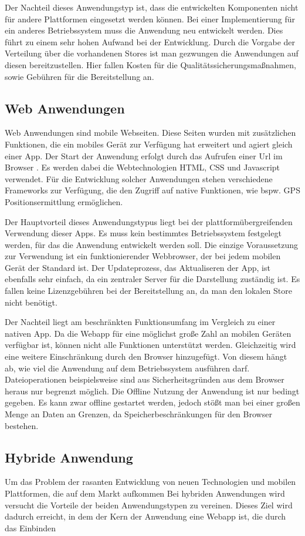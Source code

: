  Der Nachteil dieses Anwendungstyp ist, dass die entwickelten Komponenten nicht für andere Plattformen eingesetzt werden können. Bei einer Implementierung für ein anderes Betriebssystem muss die Anwendung neu entwickelt werden. Dies führt zu einem sehr hohen Aufwand bei der Entwicklung. Durch die Vorgabe der Verteilung über die vorhandenen Stores ist man gezwungen die Anwendungen auf diesen bereitzustellen. Hier fallen Kosten für die Qualitätssicherungsmaßnahmen, sowie Gebühren für die Bereitstellung an.

\subsection{Web Anwendungen}
Web Anwendungen sind mobile Webseiten. Diese Seiten wurden mit zusätzlichen Funktionen, die ein mobiles Gerät zur Verfügung hat erweitert und agiert gleich einer App. Der Start der Anwendung erfolgt durch das Aufrufen einer Url im Browser . Es werden dabei die Webtechnologien HTML, CSS und Javascript verwendet. Für die Entwicklung solcher Anwendungen stehen verschiedene Frameworks zur Verfügung, die den Zugriff auf native Funktionen, wie bspw. GPS Positionsermittlung ermöglichen.   \par

Der Hauptvorteil dieses Anwendungstypus liegt bei der plattformübergreifenden Verwendung dieser Apps. Es muss kein bestimmtes Betriebssystem festgelegt werden, für das die Anwendung entwickelt werden soll. Die einzige Voraussetzung zur Verwendung ist ein funktionierender Webbrowser, der bei jedem mobilen Gerät der Standard ist. Der Updateprozess, das Aktualiseren der App, ist ebenfalls sehr einfach, da ein zentraler Server für die Darstellung zuständig ist. Es fallen keine Lizenzgebühren bei der Bereitstellung an, da man den lokalen Store nicht benötigt. 

Der Nachteil liegt am beschränkten Funktionsumfang im Vergleich zu einer nativen App. Da die Webapp für eine möglichst große Zahl an mobilen Geräten verfügbar ist, können nicht alle Funktionen unterstützt werden. Gleichzeitig wird eine weitere Einschränkung durch den Browser hinzugefügt. Von diesem hängt ab, wie viel die Anwendung auf dem Betriebssystem ausführen darf. Dateioperationen beispielsweise sind aus Sicherheitsgründen aus dem Browser heraus nur begrenzt möglich. Die Offline Nutzung der Anwendung ist nur bedingt gegeben. Es kann zwar offline gestartet werden, jedoch stößt man bei einer großen Menge an Daten an Grenzen, da Speicherbeschränkungen für den Browser bestehen.

\subsection{Hybride Anwendung}
Um das Problem der rasanten Entwicklung von neuen Technologien und mobilen Plattformen, die auf dem Markt aufkommen 
Bei hybriden Anwendungen wird versucht die Vorteile der beiden Anwendungstypen zu vereinen. Dieses Ziel wird dadurch erreicht, in dem der Kern der Anwendung eine Webapp ist, die durch das Einbinden 

